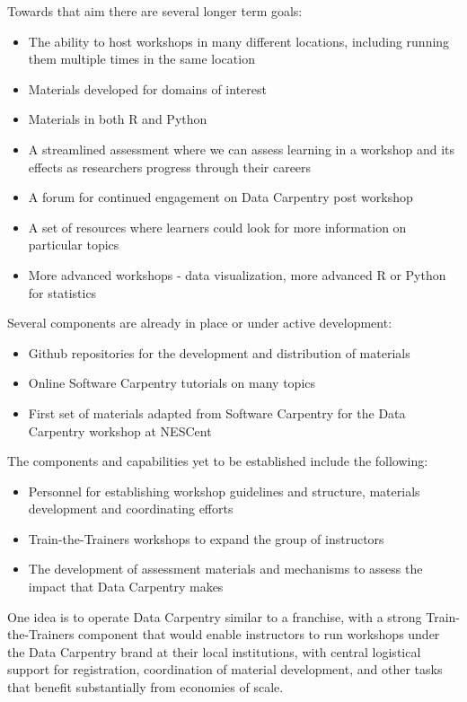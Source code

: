 \documentclass[15]{idcc}
\begin{document}
Towards that aim there are several longer term goals:
\begin{itemize}
\item The ability to host workshops in many different locations, including running them multiple times in the same location 
\item Materials developed for domains of interest 
\item Materials in both R and Python 
\item A streamlined assessment where we can assess learning in a workshop and its effects as researchers progress through their careers
\item A forum for continued engagement on Data Carpentry post workshop
\item A set of resources where learners could look for more information on particular topics
\item More advanced workshops - data visualization, more advanced R or Python for statistics
\end{itemize}

Several components are already in place or under active development:
\begin{itemize}
\item Github repositories for the development and distribution of materials
\item Online Software Carpentry tutorials on many topics
\item First set of materials adapted from Software Carpentry for the Data Carpentry workshop at NESCent
\end{itemize}

The components and capabilities yet to be established include the following:
\begin{itemize}
\item Personnel for establishing workshop guidelines and structure, materials development and coordinating efforts
\item Train-the-Trainers workshops to expand the group of instructors
\item The development of assessment materials and mechanisms to assess the impact that Data Carpentry makes
\end{itemize}

One idea is to operate Data Carpentry similar to a franchise, with a strong Train-the-Trainers component that would enable instructors to run workshops under the Data Carpentry brand at their local institutions, with central logistical support for registration, coordination of material development, and other tasks that benefit substantially from economies of scale.
\end{document}
